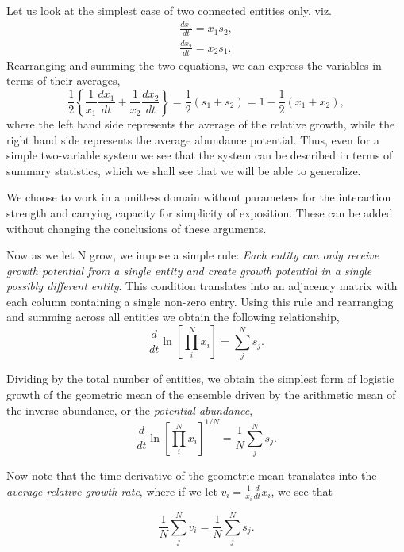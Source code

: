 \documentclass{article}
\begin{document}
Let us look at the simplest case of two connected entities only, viz.
\begin{eqnarray}
\frac{d x_1}{dt} = x_1 s_2, \\
\frac{d x_2}{dt} = x_2 s_1.
\end{eqnarray}
Rearranging and summing the two equations, we can express the variables in terms of their averages,
\begin{equation}
\frac{1}{2} \left\{\frac{1}{x_1}\frac{d x_1}{dt} + \frac{1}{x_2}\frac{d x_2}{dt}\right\} = \frac{1}{2}(s_1 + s_2) = 1 - \frac{1}{2}(x_1 + x_2),
\end{equation}
where the left hand side represents the average of the relative growth, while the right hand side represents the average abundance potential. Thus, even for a simple two-variable system we see that the system can be described in terms of summary statistics, which we shall see that we will be able to generalize.

We choose to work in a unitless domain without parameters for the interaction strength and carrying capacity for simplicity of exposition. These can be added without changing the conclusions of these arguments. 

Now as we let N grow, we impose a simple rule: \textit{Each entity can only receive growth potential from a single entity and create growth potential in a single possibly different entity}. This condition translates into an adjacency matrix with each column containing a single non-zero entry. 
Using this rule and rearranging and summing across all entities we obtain the following relationship,
\begin{equation}
\label{eq:modSIR2}
\frac{d}{dt} \ln \left[ \prod_i^N x_i \right ] = \sum_j^N s_{j}.
\end{equation}

Dividing by the total number of entities, we obtain the simplest form of logistic growth of the geometric mean of the ensemble driven by the arithmetic mean of the inverse abundance, or the \textit{potential abundance}, 
\begin{equation}
\label{eq:modSIR3}
\frac{d}{dt} \ln \left[ \prod_i^N x_i \right ]^{1/N} = \frac{1}{N}\sum_j^N s_j.
\end{equation}

Now note that the time derivative of the geometric mean translates into the \textit{average relative growth rate}, where if we let $v_i=\frac{1}{x_i}\frac{d}{dt}x_i$, we see that

\begin{equation}
\label{eq:modSIR4}
\frac{1}{N}\sum_j^N v_i = \frac{1}{N}\sum_j^N s_j.
\end{equation}
\end{document}
